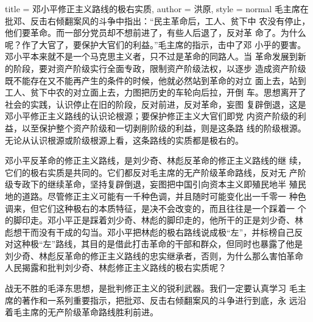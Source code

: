 \begin{hongqiarticle}{
        title  = {邓小平修正主义路线的极右实质},
        author = {洪原},
        style  = normal
    }
    毛主席在批邓、反击右倾翻案风的斗争中指出：“民主革命后，工人、贫下中
    农没有停止，他们要革命。而一部分党员却不想前进了，有些人后退了，反对革
    命了。为什么呢？作了大官了，要保护大官们的利益。”毛主席的指示，击中了邓
    小乎的要害。邓小平本来就不是一个马克思主义者，只不过是革命的同路人。当
    革命发展到新的阶段，要对资产阶级实行全面专政，限制资产阶级法权，以逐步
    造成资产阶级既不能存在又不能再产生的条件的时候，他就必然站到革命的对立
    面上去，站到工人、贫下中农的对立面上去，力图把历史的车轮向后拉，开倒
    车。思想离开了社会的实践，认识停止在旧的阶段，反对前进，反对革命，妄图
    复辟倒退，这是邓小平修正主义路线的认识论根源；要保护修正主义大官们即党
    内资产阶级的利益，以至保护整个资产阶级和一切剥削阶级的利益，则是这条路
    线的阶级根源。无论从认识根源或阶级根源上看，这条路线的实质都是极右的。

    邓小平反革命的修正主义路线，是刘少奇、林彪反革命的修正主义路线的继
    续，它们的极右实质是共同的。它们都反对毛主席的无产阶级革命路线，反对无
    产阶级专政下的继续革命，坚持复辟倒退，妄图把中国引向资本主义即殖民地半
    殖民地的道路。尽管修正主义可能有一千种色调，并且随时可能变化出一千零一
    种色调来，但它们这种极右的本质特征，是决不会改变的，而且往往是一个踩着一
    个的脚印走。邓小平正是踩着刘少奇、林彪的脚印走的，他所干的正是刘少奇、林
    彪想干而没有干成的勾当。邓小平把林彪的极右路线说成极“左”，并标榜自己反
    对这种极“左”路线，其目的是借此打击革命的干部和群众，但同时也暴露了他是
    刘少奇、林彪反革命的修正主义路线的忠实继承者，否则，为什么那么害怕革命
    人民揭露和批判刘少奇、林彪修正主义路线的极右实质呢？

    战无不胜的毛泽东思想，是批判修正主义的锐利武器。我们一定要认真学习
    毛主席的著作和一系列重要指示，把批邓、反击右倾翻案风的斗争进行到底，永
    远沿着毛主席的无产阶级革命路线胜利前进。
\end{hongqiarticle}